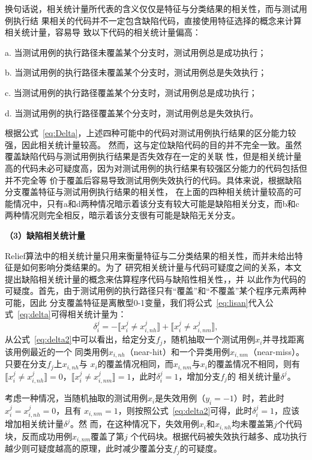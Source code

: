 换句话说，相关统计量所代表的含义仅仅是特征与分类结果的相关性，而与测试用例执行结
果相关的代码并不一定包含缺陷代码，直接使用特征选择的概念来计算相关统计量，容易导
致以下代码的相关统计量偏高：

a. 当测试用例的执行路径未覆盖某个分支时，测试用例总是成功执行；

b. 当测试用例的执行路径未覆盖某个分支时，测试用例总是失效执行；

c. 当测试用例的执行路径覆盖某个分支时，测试用例总是成功执行；

d. 当测试用例的执行路径覆盖某个分支时，测试用例总是失效执行。

根据公式~\ref{eq:Delta}，上述四种可能中的代码对测试用例执行结果的区分能力较强，因此相关统计量较高。
然而，这与定位缺陷代码的目的并不完全一致。虽然覆盖缺陷代码与测试用例执行结果是否失效存在一定的关联
性，但是相关统计量高的代码未必可疑度高，因为对测试用例的执行结果有较强区分能力的代码包括但并不完全等
价于覆盖后容易导致测试用例失效执行的代码。具体来说，根据缺陷分支覆盖特征与测试用例执行结果的相关性，
在上面的四种相关统计量较高的可能情况中，只有a和d两种情况暗示着该分支有较大可能是缺陷相关分支，而b和c
两种情况则完全相反，暗示着该分支很有可能是缺陷无关分支。

\textbf{（3）缺陷相关统计量}

Relief算法中的相关统计量只用来衡量特征与二分类结果的相关性，而并未给出特征是如何影响分类结果的。为了
研究相关统计量与代码可疑度之间的关系，本文提出缺陷相关统计量的概念来估算程序代码与缺陷性相关性，，并
以此作为代码的可疑度。首先，由于测试用例的执行路径只有``覆盖''和``不覆盖''某个程序元素两种可能，因此
分支覆盖特征是离散型0-1变量，我们将公式~\ref{eq:lisan}代入公式~\ref{eq:delta}可得相关统计量为：
\begin{equation}
       \delta^j_i = -\llbracket x_i^j \neq x_{i,nh}^j \rrbracket + \llbracket x_i^j \neq x_{i,nm}^j \rrbracket, \label{eq:delta2}
\end{equation}
从公式~\ref{eq:delta2}中可以看出，给定分支$f_j$，随机抽取一个测试用例$x_i$并寻找距离该用例最近的一个
同类用例$x_{i,nh}$（near-hit）和一个异类用例$x_{i,nm}$（near-miss）。只要在分支$f_j$上$x_{i,nh}$与
$x_i$的覆盖情况相同，而$x_{i,nm}$与$x_i$的覆盖情况不相同，则有$\llbracket x_i^j \neq x_{i,nh}^j
\rrbracket=0$，$\llbracket x_i^j \neq x_{i,nm}^j \rrbracket=1$，此时$\delta_i^j=1$，增加分支$f_j$的
相关统计量$\delta^j$。

考虑一种情况，当随机抽取的测试用例$x_i$是失效用例（$y_i=-1$）时，若此时$x_i^j=x_{i,nh}^j=0$，且有
$x_{i,nm}=1$，则按照公式~\ref{eq:delta2}可得，此时$\delta_i^j=1$，应该增加相关统计量$\delta^j$。然
而，在这种情况下，失效用例$x_i$和$x_{i,nh}$均未覆盖第$j$个代码块，反而成功用例$x_{i,nm}$覆盖了第$j$
个代码块。根据代码被失效执行越多、成功执行越少则可疑度越高的原理，此时减少覆盖分支$f_j$的可疑度。

